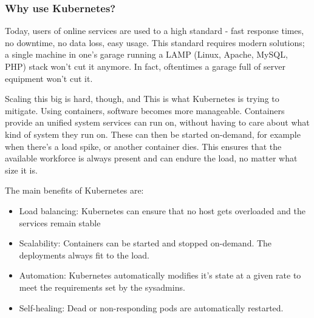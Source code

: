 \subsubsection{Why use Kubernetes?}
Today, users of online services are used to a high standard - fast response times, no downtime, no data loss, easy usage. This standard requires modern solutions; a single machine in one's garage running a LAMP\cite{lamp} (Linux, Apache, MySQL, PHP) stack won't cut it anymore. In fact, oftentimes a garage full of server equipment won't cut it.

Scaling this big is hard, though, and This is what Kubernetes is trying to mitigate. Using containers, software becomes more manageable. Containers provide an unified system services can run on, without having to care about what kind of system they run on. These can then be started on-demand, for example when there's a load spike, or another container dies. This ensures that the available workforce is always present and can endure the load, no matter what size it is.

\noindent
The main benefits of Kubernetes are:
\begin{itemize}
	\item Load balancing: Kubernetes can ensure that no host gets overloaded and the services remain stable
	\item Scalability: Containers can be started and stopped on-demand. The deployments always fit to the load.
	\item Automation: Kubernetes automatically modifies it's state at a given rate to meet the requirements set by the sysadmins.
	\item Self-healing: Dead or non-responding pods are automatically restarted.
\end{itemize}

